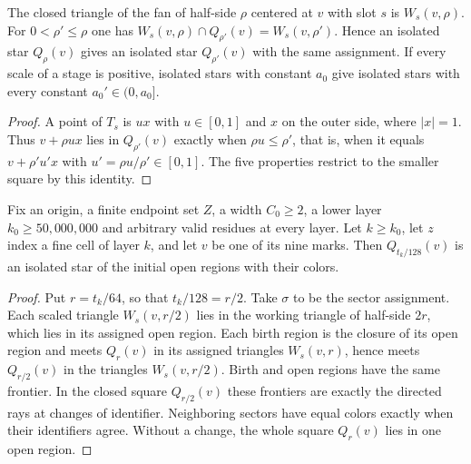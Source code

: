 \begin{lemma}
    \label{lem:area_law_isolated_star_mono}
    \leanok
    The closed triangle of the fan of half-side $\rho$ centered at $v$
    with slot $s$ is $W_s(v,\rho)$. For $0<\rho'\le\rho$ one has
    $W_s(v,\rho)\cap Q_{\rho'}(v)=W_s(v,\rho')$. Hence an isolated star
    $Q_\rho(v)$ gives an isolated star $Q_{\rho'}(v)$ with the same
    assignment. If every scale of a stage is positive, isolated stars
    with constant $a_0$ give isolated stars with every constant
    $a_0'\in(0,a_0]$.
\end{lemma}
\begin{proof}\leanok
    A point of $T_s$ is $ux$ with $u\in[0,1]$ and $x$ on the outer side,
    where $|x|=1$. Thus $v+\rho ux$ lies in $Q_{\rho'}(v)$ exactly when
    $\rho u\le\rho'$, that is, when it equals $v+\rho'u'x$ with
    $u'=\rho u/\rho'\in[0,1]$. The five properties restrict to the
    smaller square by this identity.
\end{proof}

\begin{lemma}
    \label{thm:area_law_initial_mark_isolated_star}
    \leanok
    Fix an origin, a finite endpoint set $Z$, a width $C_0\ge2$, a lower
    layer $k_0\ge50{,}000{,}000$ and arbitrary valid residues at every
    layer. Let $k\ge k_0$, let $z$ index a fine cell of layer $k$,
    and let $v$ be one of its nine marks. Then $Q_{t_k/128}(v)$ is an
    isolated star of the initial open regions with their colors.
\end{lemma}
\begin{proof}\leanok
    Put $r=t_k/64$, so that $t_k/128=r/2$. Take $\sigma$ to be the
    sector assignment. Each scaled triangle $W_s(v,r/2)$ lies in
    the working triangle of half-side $2r$, which lies in its assigned
    open region. Each birth region is the closure of its open region and
    meets $Q_r(v)$ in its assigned triangles $W_s(v,r)$, hence meets
    $Q_{r/2}(v)$ in the triangles $W_s(v,r/2)$. Birth and open regions
    have the same frontier. In the closed square $Q_{r/2}(v)$ these
    frontiers are exactly the directed rays at changes of identifier.
    Neighboring sectors have equal colors exactly when their identifiers
    agree. Without a change, the whole square $Q_r(v)$ lies in one open
    region.
\end{proof}

